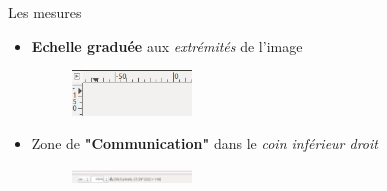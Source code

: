 \documentclass[10pt,svgnames,usenames,table]{beamer}
\begin{document}
\begin{frame}[allowframebreaks]{Les mesures}
\begin{itemize}
	\item \textbf{Echelle graduée} aux \textit{extrémités} de l'image
	
	\begin{figure}
        	\centering
        	\includegraphics[width=0.3\textwidth]{Images/Scale.png} 
        \end{figure}

	\vspace{0.3cm}	
	
	\item Zone de \textbf{"Communication"} dans le \textit{coin inférieur droit}

	\begin{figure}
        	\centering
        	\includegraphics[width=0.3\textwidth]{Images/commu.png} 
	\end{figure}
	

\end{itemize}
\end{frame}
\end{document}
